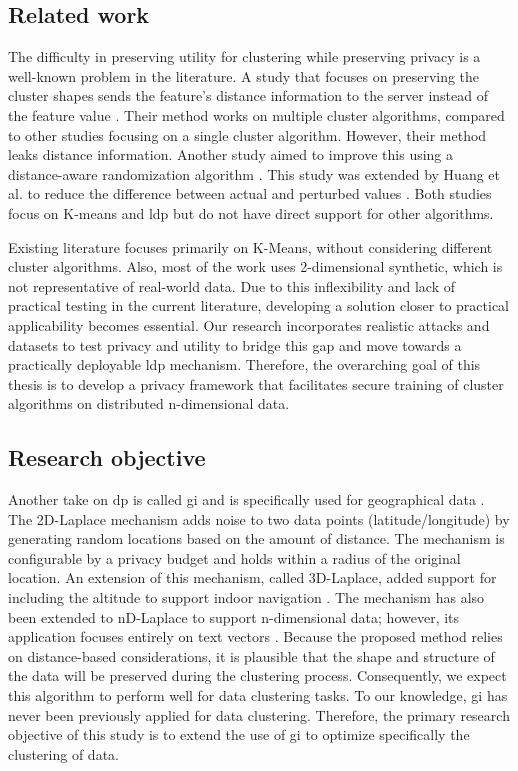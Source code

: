 \newpage

\subsection*{Related work}
The difficulty in preserving utility for clustering while preserving privacy is a well-known problem in the literature.
A study that focuses on preserving the cluster shapes sends the feature’s distance information to the server instead of the feature value \citep{sun_distributed_2019}.
Their method works on multiple cluster algorithms, compared to other studies focusing on a single cluster algorithm.
However, their method leaks distance information. Another study aimed to improve this using a distance-aware randomization algorithm \cite{xia_distributed_2020}.
This study was extended by Huang et al. to reduce the difference between actual and perturbed values \citep{9679364}.
Both studies focus on K-means and \gls{ldp} but do not have direct support for other algorithms. \newline

Existing literature focuses primarily on K-Means, without considering different cluster algorithms.
Also, most of the work uses 2-dimensional synthetic, which is not representative of real-world data.
Due to this inflexibility and lack of practical testing in the current literature, developing a solution closer to practical applicability becomes essential.
Our research incorporates realistic attacks and datasets to test privacy and utility to bridge this gap and move towards a practically deployable \gls{ldp} mechanism.
Therefore, the overarching goal of this thesis is to develop a privacy framework that facilitates secure training of cluster algorithms on distributed n-dimensional data.

\subsection*{Research objective}
Another take on \gls{dp} is called \gls{gi} and is specifically used for geographical data  \citep{DBLP:journals/corr/abs-1212-1984}.
The 2D-Laplace mechanism adds noise to two data points (latitude/longitude) by generating random locations based on the amount of distance.
The mechanism is configurable by a privacy budget and holds within a radius of the original location.
An extension of this mechanism, called 3D-Laplace, added support for including the altitude to support indoor navigation \citep{9646489}.
The mechanism has also been extended to nD-Laplace to support n-dimensional data; however, its application focuses entirely on text vectors \citep{fernandes_generalised_2019}. \newline
Because the proposed method relies on distance-based considerations, it is plausible that the shape and structure of the data will be preserved during the clustering process.
Consequently, we expect this algorithm to perform well for data clustering tasks.
To our knowledge, \gls{gi} has never been previously applied for data clustering.
Therefore, the primary research objective of this study is to extend the use of \gls{gi} to optimize specifically the clustering of data. \newline

